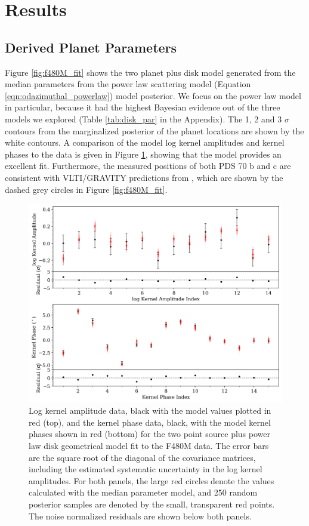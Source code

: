 \documentclass[11pt,twocolumn,twocolappendix]{aastex631}
\begin{document}
\section{Results} 
\label{sec:res}

\subsection{Derived Planet Parameters}

Figure \ref{fig:f480M_fit} shows the two planet plus disk  model generated from the median parameters from the {power law scattering model (Equation \ref{eqn:odazimuthal_powerlaw})} model posterior. {We focus on the power law model in particular, because it had the highest Bayesian evidence out of the three models we explored (Table \ref{tab:disk_par} in the Appendix)}. {The 1, 2 and 3 $\sigma$ contours from the marginalized posterior of the planet locations are shown by the white contours. A comparison of the model log kernel amplitudes and kernel phases} 
to the data is given in Figure \ref{fig:f480Mkernels}, showing that the model provides an excellent fit. 
Furthermore, the measured positions of both PDS 70 b and c are consistent with VLTI/GRAVITY predictions from \cite{2021AJ....161..148W}, which are shown by the dashed grey circles in Figure \ref{fig:f480M_fit}.

\begin{figure}
\centering
\includegraphics[width=0.85\linewidth]{kernel_observables_fit_revNEW.png}
\caption{%
{Log kernel amplitude data, black with the model values plotted in red (top), and the kernel phase data, black, with the model kernel phases shown in red (bottom)}
for the two point source plus {power law} disk geometrical model fit to the F480M data. The error bars are the square root of the diagonal of the covariance matrices, including the estimated systematic uncertainty in the log kernel amplitudes. For both panels, the large red circles denote the values calculated with the median parameter model, and 250 random posterior samples are denoted by the small, transparent red points. The noise normalized residuals are shown below both panels.}
\label{fig:f480Mkernels}
\end{figure}
\end{document}
